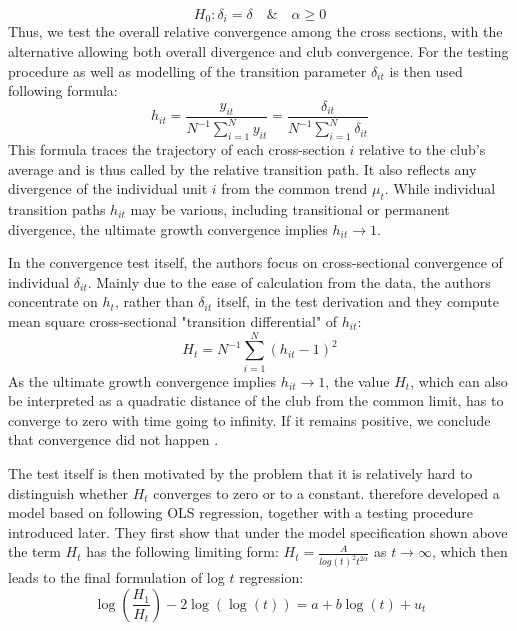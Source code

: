 \documentclass[11pt]{article}
\begin{document}
\begin{equation} \label{eq6} H_0: \delta_{i} = \delta \quad \& \quad \alpha \geq 0 \end{equation} Thus, we test the overall relative convergence among the cross sections, with the alternative allowing both overall divergence and club convergence.
For the testing procedure as well as modelling of the transition parameter $\delta_{it}$ is then used following formula:
\begin{equation}\label{eq8}h_{it} = \frac{y_{it}}{N^{-1}\sum\limits_{i=1}^Ny_{it}} = \frac{\delta_{it}}{N^{-1}\sum\limits_{i=1}^N\delta_{it}}\end{equation}
This formula traces the trajectory of each cross-section $i$ relative to the club's average and is thus called by \citet{phillips2009economic} the relative transition path. It also reflects any divergence of the individual unit $i$ from the common trend $\mu_t$. While individual transition paths $h_{it}$ may be various, including transitional or permanent divergence, the ultimate growth convergence implies \(h_{it} \rightarrow 1\).

In the convergence test itself, the authors focus on cross-sectional convergence of individual $\delta_{it}$. Mainly due to the ease of calculation from the data, the authors concentrate on $h_{t}$, rather than $\delta_{it}$ itself, in the test derivation and they compute mean square cross-sectional "transition differential" of $h_{it}$:
\begin{equation}\label{eq9}H_t = N^{-1}\sum\limits_{i=1}^N(h_{it} - 1)^2 \end{equation}
As the ultimate growth convergence implies \(h_{it} \rightarrow 1\), the value $H_{t}$, which can also be interpreted as a quadratic distance of the club from the common limit, has to converge to zero with time going to infinity. If it remains positive, we conclude that convergence did not happen \citep{phillips2009economic}.

The test itself is then motivated by the problem that it is relatively hard to distinguish whether $H_t$ converges to zero or to a constant. \citet{phillips2007transition} therefore developed a model based on following OLS regression, together with a testing procedure introduced later. They first show that under the model specification shown above the term $H_{t}$ has the following limiting form: \(H_{t} = \frac{A}{log (t)^2t^{2\alpha}}\) as \(t \rightarrow \infty\), which then leads to the final formulation of log $t$ regression:
\begin{equation}\label{eq10}\log\left(\frac{H_1}{H_t}\right)-2\log(\log(t)) = a + b\log(t) + u_t\end{equation}
\end{document}
